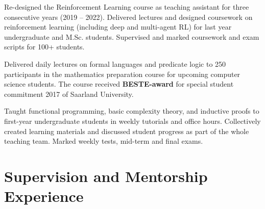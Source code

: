 \documentclass[a4paper,12pt]{article}
\begin{document}
\begin{expblock}
    Re-designed the Reinforcement Learning course as teaching assistant for three consecutive years (2019 -- 2022). Delivered lectures and designed coursework on reinforcement learning (including deep and multi-agent RL) for last year undergraduate and M.Sc. students. Supervised and marked coursework and exam scripts for 100+ students.
\end{expblock}

\begin{expblock}
    Delivered daily lectures on formal languages and predicate logic to 250 participants in the mathematics preparation course for upcoming computer science students. The course received \textbf{BESTE-award} for special student commitment 2017 of Saarland University.
\end{expblock}

\begin{expblock}
    Taught functional programming, basic complexity theory, and inductive proofs to first-year undergraduate students in weekly tutorials and office hours. Collectively created learning materials and discussed student progress as part of the whole teaching team. Marked weekly tests, mid-term and final exams.
\end{expblock}

\section{Supervision and Mentorship Experience}

\end{document}
